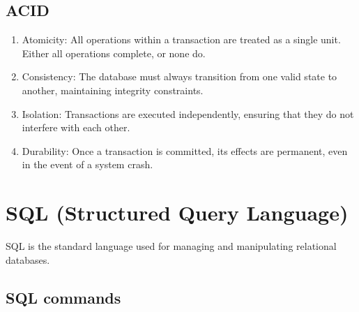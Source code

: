 \documentclass[openany]{book} %
\begin{document}
\subsection{ACID}
\begin{enumerate}
\item Atomicity: All operations within a transaction are treated as a single unit. Either all operations complete, or none do.
\item Consistency: The database must always transition from one valid state to another, maintaining integrity constraints.
\item Isolation: Transactions are executed independently, ensuring that they do not interfere with each other.
\item Durability: Once a transaction is committed, its effects are permanent, even in the event of a system crash.
\end{enumerate}

\section{SQL (Structured Query Language)}
SQL is the standard language used for managing and manipulating relational databases.
\subsection{SQL commands}
\end{document}
